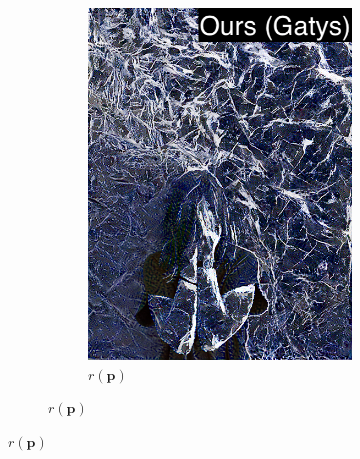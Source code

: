 \begin{figure}[]
\begin{subfigure}{\textwidth}
\begin{subfigure}{0.24\textwidth}
            \includegraphics[width=\textwidth]{images/04-experiment02/human/marble/gatys_proj_label.jpg}
            \caption*{\(r(\bm{p})\)}
        \end{subfigure}
        

\end{subfigure}
\end{figure}

